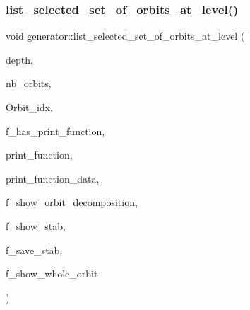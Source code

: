 \mbox{\label{classgenerator_a391f8ad3ba736baedd3dd2b7e31a0a62}} 
\subsubsection{\texorpdfstring{list\+\_\+selected\+\_\+set\+\_\+of\+\_\+orbits\+\_\+at\+\_\+level()}{list\_selected\_set\_of\_orbits\_at\_level()}}
{\footnotesize\ttfamily void generator\+::list\+\_\+selected\+\_\+set\+\_\+of\+\_\+orbits\+\_\+at\+\_\+level (\begin{DoxyParamCaption}\item[{\mbox{\hyperlink{galois_8h_a09fddde158a3a20bd2dcadb609de11dc}{I\+NT}}}]{depth,  }\item[{\mbox{\hyperlink{galois_8h_a09fddde158a3a20bd2dcadb609de11dc}{I\+NT}}}]{nb\+\_\+orbits,  }\item[{\mbox{\hyperlink{galois_8h_a09fddde158a3a20bd2dcadb609de11dc}{I\+NT}} $\ast$}]{Orbit\+\_\+idx,  }\item[{\mbox{\hyperlink{galois_8h_a09fddde158a3a20bd2dcadb609de11dc}{I\+NT}}}]{f\+\_\+has\+\_\+print\+\_\+function,  }\item[{void($\ast$)(\mbox{\hyperlink{galois_8h_a09fddde158a3a20bd2dcadb609de11dc}{I\+NT}} len, \mbox{\hyperlink{galois_8h_a09fddde158a3a20bd2dcadb609de11dc}{I\+NT}} $\ast$\mbox{\hyperlink{classgenerator_a5d2b65e2bd0e451744af1a47ba00bd96}{S}}, void $\ast$data)}]{print\+\_\+function,  }\item[{void $\ast$}]{print\+\_\+function\+\_\+data,  }\item[{\mbox{\hyperlink{galois_8h_a09fddde158a3a20bd2dcadb609de11dc}{I\+NT}}}]{f\+\_\+show\+\_\+orbit\+\_\+decomposition,  }\item[{\mbox{\hyperlink{galois_8h_a09fddde158a3a20bd2dcadb609de11dc}{I\+NT}}}]{f\+\_\+show\+\_\+stab,  }\item[{\mbox{\hyperlink{galois_8h_a09fddde158a3a20bd2dcadb609de11dc}{I\+NT}}}]{f\+\_\+save\+\_\+stab,  }\item[{\mbox{\hyperlink{galois_8h_a09fddde158a3a20bd2dcadb609de11dc}{I\+NT}}}]{f\+\_\+show\+\_\+whole\+\_\+orbit }\end{DoxyParamCaption})}

